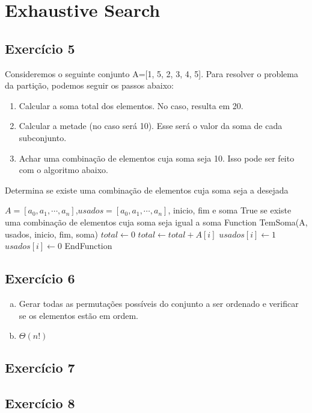 
\section{Exhaustive Search}\label{sec:exhaustive_force}

\subsection{Exercício 5}\label{sec:exer5}
Consideremos o seguinte conjunto A=[1, 5, 2, 3, 4, 5]. Para resolver o problema da
partição, podemos seguir os passos abaixo:
\begin{enumerate}
  \item Calcular a soma total dos elementos. No caso, resulta em 20.
  \item Calcular a metade (no caso será 10). Esse será o valor da soma de cada
  subconjunto.
  \item Achar uma combinação de elementos cuja soma seja 10. Isso pode ser feito
  com o algoritmo abaixo.
\end{enumerate}

\begin{algorithm}
  \caption{Determina se existe uma combinação de elementos cuja soma seja a desejada}
  \begin{algorithmic}
    \REQUIRE $A=[a_{0}, a_{1}, \cdots, a_{n}]$,$usados=[a_{0}, a_{1}, \cdots, a_{n}]$,
    inicio, fim e soma
    \ENSURE True se existe uma combinação de elementos cuja soma seja igual a soma
    \STATE Function TemSoma(A, usados, inicio, fim, soma)
    \STATE $total \leftarrow 0$
        \STATE $total \leftarrow total + A[i]$
      \ENDIF
    \ENDFOR
      \RETURN \TRUE
    \ENDIF
      \STATE $usados[i] \leftarrow 1$
        \RETURN \TRUE
      \ENDIF
      \STATE $usados[i] \leftarrow 0$
    \ENDFOR
    \RETURN \FALSE
    \STATE EndFunction
  \end{algorithmic}
\end{algorithm}


\subsection{Exercício 6}\label{sec:exer6}
\begin{enumerate}[a)]
  \item Gerar todas as permutações possíveis do conjunto a ser ordenado e verificar
  se os elementos estão em ordem.
  \item $\Theta(n!)$
\end{enumerate}


\subsection{Exercício 7}\label{sec:exer7}

\subsection{Exercício 8}\label{sec:exer8}
